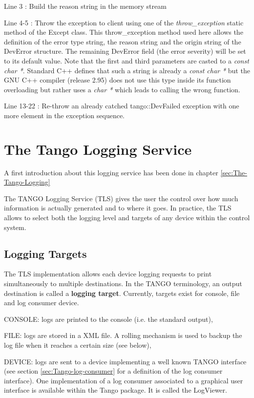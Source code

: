 Line 3 : Build the reason string in the memory stream

Line 4-5 : Throw the exception to client using one of the \emph{throw\_exception}
static method of the Except class. This throw\_exception
method used here allows the definition of the error type string, the
reason string and the origin string of the DevError structure. The
remaining DevError field (the error severity) will be set to its default
value. Note that the first and third parameters are casted to a \emph{const
char {*}}. Standard C++ defines that such a string is already a \emph{const
char {*}} but the GNU C++ compiler (release 2.95) does not use this
type inside its function overloading but rather uses a \emph{char
{*}} which leads to calling the wrong function.

Line 13-22 : Re-throw an already catched tango::DevFailed exception
with one more element in the exception sequence.


\section{The Tango Logging Service \label{The-Tango-Logging chapter}}

A first introduction about this logging service has been done in chapter
\ref{sec:The-Tango-Logging}

The TANGO Logging Service (TLS) gives the user the control over how
much information is actually generated and to where it goes. In practice,
the TLS allows to select both the logging level and targets of any
device within the control system.


\subsection{Logging Targets}

The TLS implementation allows each device logging requests to print
simultaneously to multiple destinations. In the TANGO terminology,
an output destination is called a \textbf{logging target}. Currently,
targets exist for console, file and log consumer device. 

CONSOLE: logs are printed to the console (i.e. the standard output),

FILE: logs are stored in a XML file. A rolling mechanism is used to
backup the log file when it reaches a certain size (see below), 

DEVICE: logs are sent to a device implementing a well known TANGO
interface (see section \ref{sec:Tango-log-consumer} for a definition
of the log consumer interface). One implementation of a log consumer
associated to a graphical user interface is available within the Tango
package. It is called the LogViewer.

